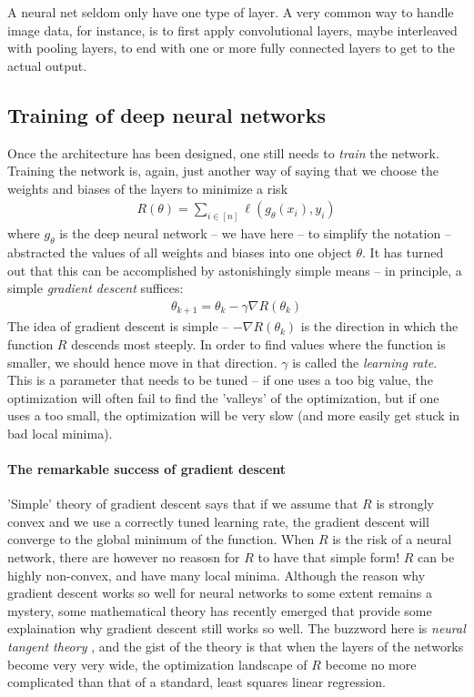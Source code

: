 \documentclass{article}
\begin{document}
A neural net seldom only have one type of layer. A very common way to handle image data, for instance, is to first apply convolutional layers, maybe interleaved with pooling layers, to end with one or more fully connected layers to get to the actual output.







\subsection{Training of deep neural networks}
Once the architecture has been designed, one still needs to \emph{train} the network. Training the network is, again, just another way of saying that we choose the weights and biases of the layers to minimize a risk
\begin{align*}
    R(\theta) = \sum_{i \in [n]} \ell(g_\theta(x_i),y_i) 
\end{align*}
where $g_\theta$ is the deep neural network -- we have here -- to simplify the notation --  abstracted the values of all weights and biases into one object $\theta$. It has turned out that this can be accomplished by astonishingly simple means -- in principle, a simple \emph{gradient descent} suffices:
\begin{align*}
    \theta_{k+1} = \theta_k - \gamma \nabla R(\theta_k)
\end{align*}
The idea of gradient descent is simple -- $-\nabla R(\theta_k)$ is the direction in which the function $R$ descends most steeply. In order to find values where the function is smaller, we should hence move in that direction. $\gamma$ is called the \emph{learning rate}. This is a parameter that needs to be tuned -- if one uses a too big value, the optimization will often fail to find the 'valleys' of the optimization, but if one uses a too small, the optimization will be very slow (and more easily get stuck in bad local minima). 


\paragraph{The remarkable success of gradient descent}
'Simple' theory of gradient descent says that if we assume that $R$ is strongly convex and we use a correctly tuned learning rate, the gradient descent will converge to the global minimum of the function. When $R$ is the risk of a neural network, there are however no reasosn for $R$ to have that simple form! $R$ can be highly non-convex, and have many local minima. Although the reason why gradient descent works so well for neural networks to some extent remains a mystery, some mathematical theory has recently emerged that provide some explaination why gradient descent still works so well. The buzzword here is \emph{neural tangent theory} \cite{jacot2018neural}, and the gist of the theory is that when the layers of the networks become very very wide, the optimization landscape of $R$ become no more complicated than that of a standard, least squares linear regression. 
\end{document}
